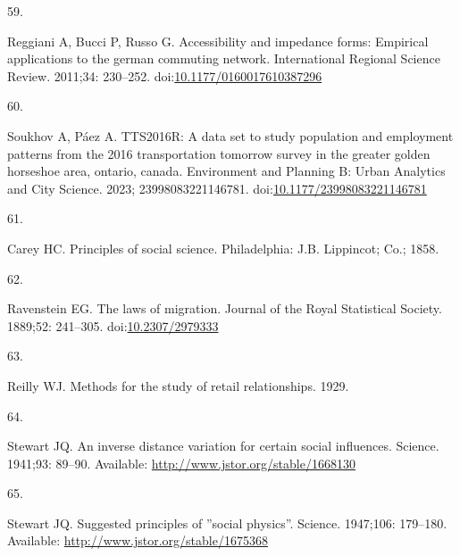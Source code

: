 \documentclass[10pt,letterpaper]{article}
\newlength{\cslhangindent}
\newlength{\csllabelwidth}
\newlength{\cslentryspacingunit} %
\newenvironment{CSLReferences}[2] %
 {%
  \setlength{\parindent}{0pt}
  \ifodd #1
  \let\oldpar\par
  \def\par{\hangindent=\cslhangindent\oldpar}
  \fi
  \setlength{\parskip}{#2\cslentryspacingunit}
 }%
 {}
\newcommand{\CSLLeftMargin}[1]{\parbox[t]{\csllabelwidth}{#1}}
\newcommand{\CSLRightInline}[1]{\parbox[t]{\linewidth - \csllabelwidth}{#1}\break}
\providecommand{\DIFaddbegin}{} %
\providecommand{\DIFaddend}{} %
\providecommand{\DIFdelbegin}{} %
\providecommand{\DIFdelend}{} %
\newcommand{\DIFscaledelfig}{0.5}
\newlength{\DIFdelgraphicswidth} %
\newlength{\DIFdelgraphicsheight} %
\newcommand{\DIFaddincludegraphics}[2][]{{\color{blue}\fbox{\DIFOincludegraphics[#1]{#2}}}} %
\newcommand{\DIFdelincludegraphics}[2][]{%
\sbox{\DIFdelgraphicsbox}{\DIFOincludegraphics[#1]{#2}}%
\settoboxwidth{\DIFdelgraphicswidth}{\DIFdelgraphicsbox} %
\settoboxtotalheight{\DIFdelgraphicsheight}{\DIFdelgraphicsbox} %
\scalebox{\DIFscaledelfig}{%
\parbox[b]{\DIFdelgraphicswidth}{\usebox{\DIFdelgraphicsbox}\\[-\baselineskip] \rule{\DIFdelgraphicswidth}{0em}}\llap{\resizebox{\DIFdelgraphicswidth}{\DIFdelgraphicsheight}{%
\setlength{\unitlength}{\DIFdelgraphicswidth}%
\begin{picture}(1,1)%
\thicklines\linethickness{2pt} %
{\color[rgb]{1,0,0}\put(0,0){\framebox(1,1){}}}%
{\color[rgb]{1,0,0}\put(0,0){\line( 1,1){1}}}%
{\color[rgb]{1,0,0}\put(0,1){\line(1,-1){1}}}%
\end{picture}%
}\hspace*{3pt}}} %
} %
\DeclareRobustCommand{\DIFaddbegin}{\DIFOaddbegin \let\includegraphics\DIFaddincludegraphics} %
\DeclareRobustCommand{\DIFaddend}{\DIFOaddend \let\includegraphics\DIFOincludegraphics} %
\DeclareRobustCommand{\DIFdelbegin}{\DIFOdelbegin \let\includegraphics\DIFdelincludegraphics} %
\DeclareRobustCommand{\DIFdelend}{\DIFOaddend \let\includegraphics\DIFOincludegraphics} %
\begin{document}
\begin{CSLReferences}{0}{0}
\leavevmode{}%
\DIFdelbegin %
\DIFdelend \DIFaddbegin \CSLLeftMargin{59. }\DIFaddend %
\CSLRightInline{Reggiani A, Bucci P, Russo G. Accessibility and
impedance forms: Empirical applications to the german commuting network.
International Regional Science Review. 2011;34: 230--252.
doi:\href{https://doi.org/10.1177/0160017610387296}{10.1177/0160017610387296}}

\leavevmode{}%
\DIFdelbegin %
\DIFdelend \DIFaddbegin \CSLLeftMargin{60. }\DIFaddend %
\CSLRightInline{Soukhov A, Páez A. {TTS}2016R: A data set to study
population and employment patterns from the 2016 transportation tomorrow
survey in the greater golden horseshoe area, ontario, canada.
Environment and Planning B: Urban Analytics and City Science. 2023;
23998083221146781.
doi:\href{https://doi.org/10.1177/23998083221146781}{10.1177/23998083221146781}}

\leavevmode{}%
\DIFdelbegin %
\DIFdelend \DIFaddbegin \CSLLeftMargin{61. }\DIFaddend %
\CSLRightInline{Carey HC. Principles of social science. Philadelphia:
J.B. Lippincot; Co.; 1858. }

\leavevmode{}%
\DIFdelbegin %
\DIFdelend \DIFaddbegin \CSLLeftMargin{62. }\DIFaddend %
\CSLRightInline{Ravenstein EG. The laws of migration. Journal of the
Royal Statistical Society. 1889;52: 241--305.
doi:\href{https://doi.org/10.2307/2979333}{10.2307/2979333}}

\leavevmode{}%
\DIFdelbegin %
\DIFdelend \DIFaddbegin \CSLLeftMargin{63. }\DIFaddend %
\CSLRightInline{Reilly WJ. Methods for the study of retail
relationships. 1929. }

\leavevmode{}%
\DIFdelbegin %
\DIFdelend \DIFaddbegin \CSLLeftMargin{64. }\DIFaddend %
\CSLRightInline{Stewart JQ. An inverse distance variation for certain
social influences. Science. 1941;93: 89--90. Available:
\url{http://www.jstor.org/stable/1668130}}

\leavevmode{}%
\DIFdelbegin %
\DIFdelend \DIFaddbegin \CSLLeftMargin{65. }\DIFaddend %
\CSLRightInline{Stewart JQ. Suggested principles of ''social physics''.
Science. 1947;106: 179--180. Available:
\url{http://www.jstor.org/stable/1675368}}


\end{CSLReferences}
\end{document}
